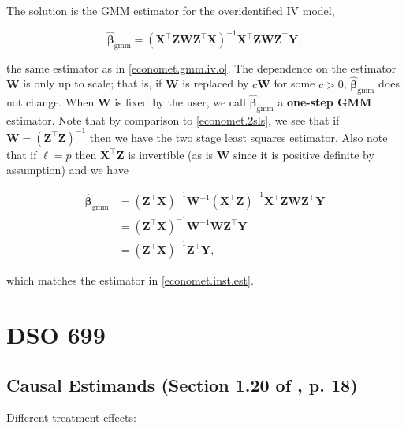 The solution is the GMM estimator for the overidentified IV model,

\[
\hat{\boldsymbol{\beta}}_{\text{gmm}} =\left(\boldsymbol{X} ^\top \boldsymbol{Z} \boldsymbol{W}  \boldsymbol{Z}^\top \boldsymbol{X}\right)^{-1}  \boldsymbol{X} ^\top \boldsymbol{Z} \boldsymbol{W} \boldsymbol{Z}^\top \boldsymbol{Y} ,
\]

the same estimator as in \eqref{economet.gmm.iv.o}. The dependence on the estimator \(\boldsymbol{W}\) is only up to scale; that is, if \(\boldsymbol{W}\) is replaced by \(c \boldsymbol{W}\) for some \(c > 0\), \(\hat{\boldsymbol{\beta}}_{\text{gmm}}\) does not change. When \(\boldsymbol{W}\) is fixed by the user, we call \(\hat{\boldsymbol{\beta}}_{\text{gmm}}\) a \textbf{one-step GMM} estimator. Note that by comparison to \eqref{economet.2sls}, we see that if \(\boldsymbol{W} = \left(  \boldsymbol{Z}^\top  \boldsymbol{Z}\right)^{-1} \) then we have the two stage least squares estimator. Also note that if \(\ell = p\) then \(\boldsymbol{X}^\top \boldsymbol{Z}\) is invertible (as is \(\boldsymbol{W}\) since it is positive definite by assumption) and we have

\begin{align*}
\hat{\boldsymbol{\beta}}_{\text{gmm}} & =  \left( \boldsymbol{Z}^\top \boldsymbol{X}\right)^{-1}\boldsymbol{W}^{-1}  \left(\boldsymbol{X} ^\top \boldsymbol{Z} \right)^{-1} \boldsymbol{X} ^\top \boldsymbol{Z} \boldsymbol{W} \boldsymbol{Z}^\top \boldsymbol{Y}
\\ & =  \left( \boldsymbol{Z}^\top \boldsymbol{X}\right)^{-1}\boldsymbol{W}^{-1}   \boldsymbol{W} \boldsymbol{Z}^\top \boldsymbol{Y} 
\\ & =  \left( \boldsymbol{Z}^\top \boldsymbol{X}\right)^{-1}\boldsymbol{Z}^\top \boldsymbol{Y}   ,
\end{align*}

which matches the estimator in \eqref{economet.inst.est}.

\section{DSO 699 \citep{imbens_rubin_2015}}

\subsection{Causal Estimands (Section 1.20 of \citet{imbens_rubin_2015}, p. 18)}

Different treatment effects:

